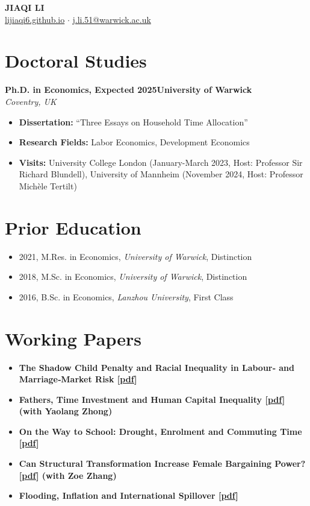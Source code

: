 \documentclass[11pt,a4paper]{article}
\newcommand{\cventry}[4]{
    \noindent\textbf{#1}\hfill\textbf{#2} \\
    \textit{#3}\hfill\textit{#4}
    \vspace{0.5em}
}
\newcommand{\cvitem}[2]{
    \item \textbf{#1} \\ #2
}
\begin{document}
\begin{center}
    {\Huge\bfseries JIAQI LI} \\
    \vspace{0.3em}
    \href{https://lijiaqi6.github.io/}{lijiaqi6.github.io} $\cdot$ \href{mailto:j.li.51@warwick.ac.uk}{j.li.51@warwick.ac.uk}
\end{center}
\vspace{1em}

\section{Doctoral Studies}
\cventry{Ph.D. in Economics, Expected 2025}{University of Warwick}{Coventry, UK}{}
\vspace{-0.5em}
\begin{itemize}[leftmargin=*, itemsep=0.2em]
    \item[] \textbf{Dissertation:} ``Three Essays on Household Time Allocation''
    \item[] \textbf{Research Fields:} Labor Economics, Development Economics
    \item[] \textbf{Visits:} University College London (January-March 2023, Host: Professor Sir Richard Blundell), University of Mannheim (November 2024, Host: Professor Michèle Tertilt)
\end{itemize}

\section{Prior Education}
\begin{itemize}[leftmargin=*, itemsep=0.2em]
    \item 2021, M.Res. in Economics, \textit{University of Warwick}, Distinction
    \item 2018, M.Sc. in Economics, \textit{University of Warwick}, Distinction
    \item 2016, B.Sc. in Economics, \textit{Lanzhou University}, First Class
\end{itemize}

\section{Working Papers}
\begin{itemize}[leftmargin=*, itemsep=0.3em]
    \cvitem{The Shadow Child Penalty and Racial Inequality in Labour‑ and Marriage‑Market Risk [\href{https://lijiaqi6.github.io/li_race.pdf}{pdf}]}{}
    \cvitem{Fathers, Time Investment and Human Capital Inequality [\href{https://lijiaqi6.github.io/Father.pdf}{pdf}] (with Yaolang Zhong)}{}
    \cvitem{On the Way to School: Drought, Enrolment and Commuting Time [\href{https://lijiaqi6.github.io/Drought.pdf}{pdf}]}{}
    \cvitem{Can Structural Transformation Increase Female Bargaining Power? [\href{https://papers.ssrn.com/sol3/papers.cfm?abstract_id=4955252}{pdf}] (with Zoe Zhang)}{}
    \cvitem{Flooding, Inflation and International Spillover [\href{https://papers.ssrn.com/sol3/papers.cfm?abstract_id=4816569}{pdf}]}{}
\end{itemize}
\end{document}
